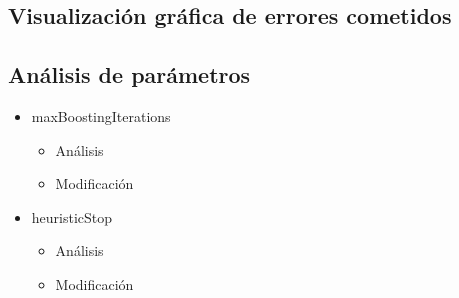 	\subsection{Visualización gráfica de errores cometidos}

	\subsection{Análisis de parámetros}

		\begin{itemize}
			\item maxBoostingIterations
				\begin{itemize}
					\item Análisis
					\item Modificación
				\end{itemize}

			\item heuristicStop
				\begin{itemize}
					\item Análisis
					\item Modificación
				\end{itemize}
		\end{itemize}